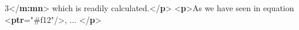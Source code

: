 \begin{shaded}
\hspace*{1em}\hspace*{1em}\hspace*{1em}\hspace*{1em}3{</\textbf{m:mn}>}\mbox{}\newline 
\hspace*{1em}\hspace*{1em}\hspace*{1em}\mbox{}\newline 
\hspace*{1em}\hspace*{1em}\mbox{}\newline 
\hspace*{1em}\mbox{}\newline 
{} which is readily calculated.{</\textbf{p}>}\mbox{}\newline 
{<\textbf{p}>}As we have seen in equation {<\textbf{ptr}\hspace*{1em}{target}="{\#f12}"/>}, ... {</\textbf{p}>}\end{shaded}\egroup\par 
